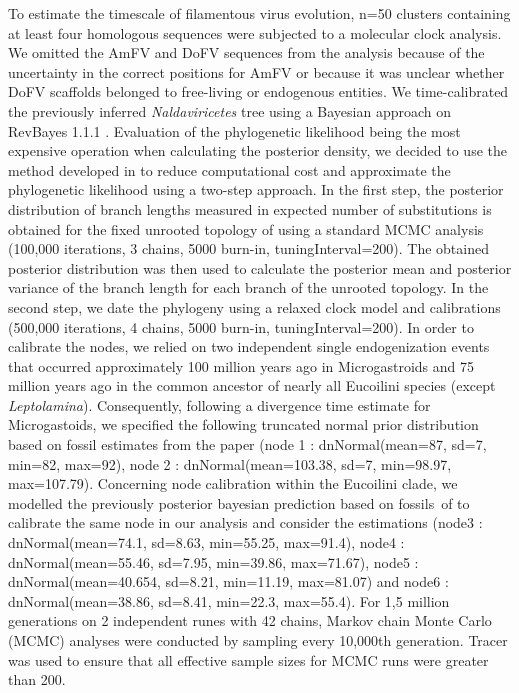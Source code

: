 To estimate the timescale of filamentous virus evolution, n=50 clusters containing at least four homologous sequences were subjected to a molecular clock analysis. We omitted the AmFV and DoFV sequences from the analysis because of the uncertainty in the correct positions for AmFV or because it was unclear whether DoFV scaffolds belonged to free-living or endogenous entities. We time-calibrated the previously inferred  \textit{Naldaviricetes} tree using a Bayesian approach on RevBayes 1.1.1 \cite{hohna_probabilistic_2014}. Evaluation of the phylogenetic likelihood being the most expensive operation when calculating the posterior density, we decided to use the method developed in \cite{szollosi_relative_2020} to reduce computational cost and approximate the phylogenetic likelihood using a two-step approach. In the first step, the posterior distribution of branch lengths measured in expected number of substitutions is obtained for the fixed unrooted topology of using a standard MCMC analysis (100,000 iterations, 3 chains, 5000 burn-in, tuningInterval=200). The obtained posterior distribution was then used to calculate the posterior mean and posterior variance of the branch length for each branch of the unrooted topology. In the second step, we date the phylogeny using a relaxed clock model and calibrations (500,000 iterations, 4 chains, 5000 burn-in, tuningInterval=200). In order to calibrate the nodes, we relied on two independent single endogenization events that occurred approximately 100 million years ago in Microgastroids and 75 million years ago in the common ancestor of nearly all Eucoilini species (except \textit{Leptolamina})\citep{blaimer_comprehensive_2020}. Consequently, following a divergence time estimate for Microgastoids, we specified the following truncated normal prior distribution based on fossil estimates from the paper \citep{murphy_phylogeny_2008} (node 1 : dnNormal(mean=87, sd=7, min=82, max=92), node 2 : dnNormal(mean=103.38, sd=7, min=98.97, max=107.79).
Concerning node calibration within the Eucoilini clade, we modelled the previously posterior bayesian prediction based on fossils of \citep{blaimer_comprehensive_2020} to calibrate the same node in our analysis and consider the estimations (node3 : dnNormal(mean=74.1,  sd=8.63, min=55.25, max=91.4), node4 : dnNormal(mean=55.46, sd=7.95, min=39.86, max=71.67), node5 : dnNormal(mean=40.654, sd=8.21, min=11.19, max=81.07) and node6 : dnNormal(mean=38.86, sd=8.41, min=22.3, max=55.4). For 1,5 million  generations on 2 independent runes with 42 chains, Markov chain Monte Carlo (MCMC) analyses were conducted by sampling every 10,000th generation. Tracer was used to ensure that all effective sample sizes for MCMC runs were greater than 200.

